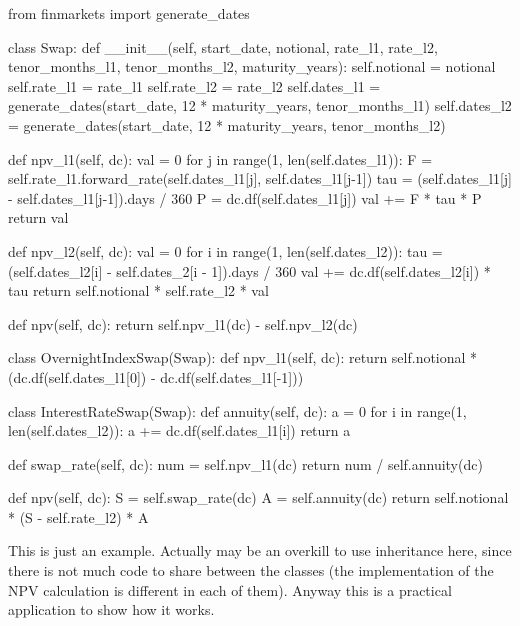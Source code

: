 \begin{ipython}
from finmarkets import generate_dates

class Swap:
    def __init__(self, start_date, notional, rate_l1, rate_l2, 
                 tenor_months_l1, tenor_months_l2, maturity_years):
        self.notional = notional
        self.rate_l1 = rate_l1
        self.rate_l2 = rate_l2
        self.dates_l1 = generate_dates(start_date, 12 * maturity_years, 
                                       tenor_months_l1)
        self.dates_l2 = generate_dates(start_date, 12 * maturity_years, 
                                       tenor_months_l2)

    def npv_l1(self, dc):
        val = 0
        for j in range(1, len(self.dates_l1)):
            F = self.rate_l1.forward_rate(self.dates_l1[j], self.dates_l1[j-1])
            tau = (self.dates_l1[j] - self.dates_l1[j-1]).days / 360
            P = dc.df(self.dates_l1[j])
            val += F * tau * P
        return val

    def npv_l2(self, dc):
        val = 0
        for i in range(1, len(self.dates_l2)):
            tau = (self.dates_l2[i] - self.dates_2[i - 1]).days / 360
            val += dc.df(self.dates_l2[i]) * tau
        return self.notional * self.rate_l2 * val

    def npv(self, dc):
        return self.npv_l1(dc) - self.npv_l2(dc)

class OvernightIndexSwap(Swap):
    def npv_l1(self, dc):
        return self.notional * (dc.df(self.dates_l1[0]) - dc.df(self.dates_l1[-1]))

class InterestRateSwap(Swap):
    def annuity(self, dc):
        a = 0
        for i in range(1, len(self.dates_l2)):
            a += dc.df(self.dates_l1[i])
        return a

    def swap_rate(self, dc):
        num = self.npv_l1(dc)
        return num / self.annuity(dc)

    def npv(self, dc):
        S = self.swap_rate(dc)
        A = self.annuity(dc)
        return self.notional * (S - self.rate_l2) * A
\end{ipython}
\begin{finmarkets}
This is just an example. Actually may be an overkill to use inheritance here, since there is not much code to share between the classes (the implementation of the NPV calculation is different in each of them). Anyway this is a practical application to show how it works.
\end{finmarkets}

